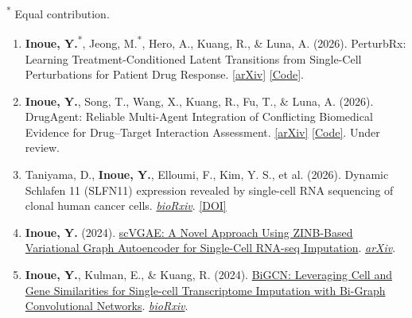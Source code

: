 \documentclass[11pt]{article}
\begin{document}
\newpage
{}
{\small\textsuperscript{*} Equal contribution.}\par
\begin{enumerate}[label={P\arabic*.}]
    \entryspace\item \textbf{Inoue, Y.}\textsuperscript{*}, Jeong, M.\textsuperscript{*}, Hero, A., Kuang, R., \& Luna, A. (2026).
    PerturbRx: Learning Treatment-Conditioned Latent Transitions from Single-Cell Perturbations for Patient Drug Response. \href{https://arxiv.org/abs/2608.21349}{[arXiv]} \href{https://anonymous.4open.science/r/PerturbRx/README.md}{[Code]}.

    \entryspace\item \textbf{Inoue, Y.}, Song, T., Wang, X., Kuang, R., Fu, T., \& Luna, A. (2026).
    DrugAgent: Reliable Multi-Agent Integration of Conflicting Biomedical Evidence for Drug--Target Interaction Assessment. \href{https://arxiv.org/abs/2408.13378}{[arXiv]} \href{https://github.com/inoue0426/DrugAgent}{[Code]}. Under review.

    \entryspace\item Taniyama, D., \textbf{Inoue, Y.}, Elloumi, F., Kim, Y. S., et al. (2026).
    Dynamic Schlafen 11 (SLFN11) expression revealed by single-cell RNA sequencing of clonal human cancer cells.
    \href{https://doi.org/10.64898/2026.10.01.755884}{\textit{bioRxiv}}. \href{https://doi.org/10.64898/2026.10.01.755884}{[DOI]}

    \entryspace\item \textbf{Inoue, Y.} (2024).
    \href{https://arxiv.org/abs/2403.08959}{scVGAE: A Novel Approach Using ZINB-Based Variational Graph Autoencoder for Single-Cell RNA-seq Imputation}.
    \href{https://arxiv.org/abs/2403.08959}{\textit{arXiv}}.

    \entryspace\item \textbf{Inoue, Y.}, Kulman, E., \& Kuang, R. (2024).
    \href{https://doi.org/10.1101/2024.04.05.588342}{BiGCN: Leveraging Cell and Gene Similarities for Single-cell Transcriptome Imputation with Bi-Graph Convolutional Networks}.
    \href{https://doi.org/10.1101/2024.04.05.588342}{\textit{bioRxiv}}.
\end{enumerate}
\end{document}
